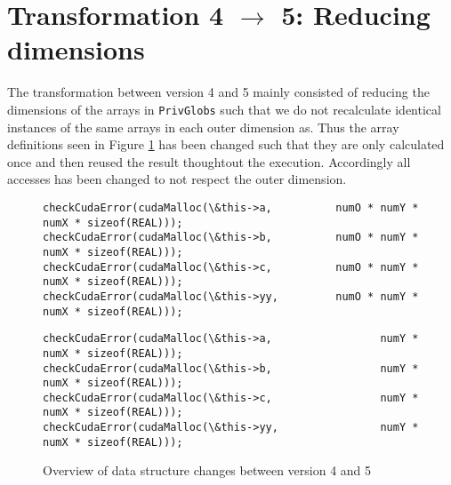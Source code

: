 \section{Transformation 4 $\rightarrow$ 5: Reducing dimensions}
The transformation between version 4 and 5 mainly consisted of reducing the dimensions of the arrays in \texttt{PrivGlobs} such that we do not recalculate identical instances of the same arrays in each outer dimension as.\n
Thus the array definitions seen in Figure \ref{dimreductions} has been changed such that they are only calculated once and then reused the result thoughtout the execution. Accordingly all accesses has been changed to not respect the outer dimension.

\begin{figure}[H]
    \centering
\begin{Verbatim}[label={4\_OuterParallelCuda/ProjHelperFun.h}]
checkCudaError(cudaMalloc(\&this->a,          numO * numY * numX * sizeof(REAL)));
checkCudaError(cudaMalloc(\&this->b,          numO * numY * numX * sizeof(REAL)));
checkCudaError(cudaMalloc(\&this->c,          numO * numY * numX * sizeof(REAL)));
checkCudaError(cudaMalloc(\&this->yy,         numO * numY * numX * sizeof(REAL)));
\end{Verbatim}
\vspace{2mm}
\begin{Verbatim}[label={5\_ReducedCudaDimensions/ProjHelperFun.h}]
checkCudaError(cudaMalloc(\&this->a,                 numY * numX * sizeof(REAL)));
checkCudaError(cudaMalloc(\&this->b,                 numY * numX * sizeof(REAL)));
checkCudaError(cudaMalloc(\&this->c,                 numY * numX * sizeof(REAL)));
checkCudaError(cudaMalloc(\&this->yy,                numY * numX * sizeof(REAL)));
\end{Verbatim}
\caption{Overview of data structure changes between version 4 and 5\label{dimreductions}}
\end{figure}